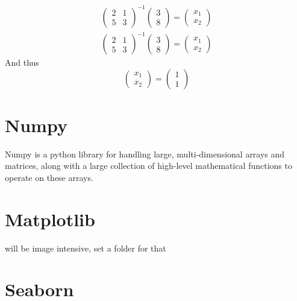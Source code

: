 \begin{equation}
	\begin{aligned}
	\left(
	\begin{array}{cc}
		2&1\\
		5&3
	\end{array}
	\right)^{-1}
	\left(
	\begin{array}{c}
		3\\
		8 
	\end{array}
	\right)
	=
	\left(
	\begin{array}{c}
	x_1\\
	x_2 
	\end{array}
	\right)\\
	\left(
	\begin{array}{cc}
		2&1\\
		5&3
	\end{array}
	\right)^{-1}
	\left(
	\begin{array}{c}
		3\\
		8 
	\end{array}
	\right)
	=
	\left(
	\begin{array}{c}
		x_1\\
		x_2 
	\end{array}
	\right)
	\end{aligned}
\end{equation}
\noindent And thus
\begin{equation}
	\left(
	\begin{array}{c}
		x_1\\
		x_2 
	\end{array}
	\right)
	=
	\left(
	\begin{array}{c}
		1\\
		1 
	\end{array}
	\right)
\end{equation}
\section{Numpy}
Numpy is a python library for handling large, multi-dimensional arrays and matrices, along with a large collection of high-level mathematical functions to operate on these arrays.
\section{Matplotlib}
will be image intensive, set a folder for that
\section{Seaborn}